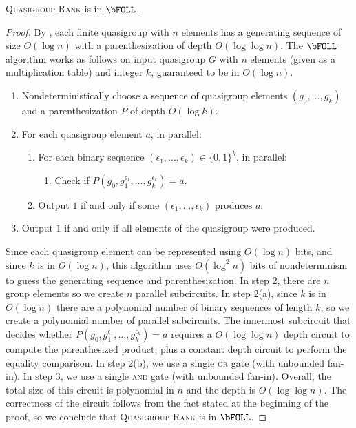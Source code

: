 \documentclass{article}
\begin{document}
\begin{theorem}
  \textsc{Quasigroup Rank} is in $\bFOLL$.
\end{theorem}
\begin{proof}
  By \autocite[Theorem~3.3]{ctw13}, each finite quasigroup with $n$ elements has a generating sequence of size $O(\log n)$ with a parenthesization of depth $O(\log \log n)$.
  The $\bFOLL$ algorithm works as follows on input quasigroup $G$ with $n$ elements (given as a multiplication table) and integer $k$, guaranteed to be in $O(\log n)$.
  \begin{enumerate}
  \item Nondeterministically choose a sequence of quasigroup elements $(g_0, \dotsc, g_k)$ and a parenthesization $P$ of depth $O(\log k)$.
  \item For each quasigroup element $a$, in parallel:
    \begin{enumerate}
    \item For each binary sequence $(\epsilon_1, \dotsc, \epsilon_k) \in \{0, 1\}^k$, in parallel:
      \begin{enumerate}
      \item Check if $P\left(g_0, g_1^{\epsilon_1}, \dotsc, g_k^{\epsilon_k}\right) = a$.
      \end{enumerate}
    \item Output $1$ if and only if some $(\epsilon_1, \dotsc, \epsilon_k)$ produces $a$.
    \end{enumerate}
  \item Output $1$ if and only if all elements of the quasigroup were produced.
  \end{enumerate}
  Since each quasigroup element can be represented using $O(\log n)$ bits, and since $k$ is in $O(\log n)$, this algorithm uses $O(\log^2 n)$ bits of nondeterminism to guess the generating sequence and parenthesization.
  In step 2, there are $n$ group elements so we create $n$ parallel subcircuits.
  In step 2(a), since $k$ is in $O(\log n)$ there are a polynomial number of binary sequences of length $k$, so we create a polynomial number of parallel subcircuits.
  The innermost subcircuit that decides whether $P(g_0, g_1^{\epsilon_1}, \dotsc, g_k^{\epsilon_k}) = a$ requires a $O(\log \log n)$ depth circuit to compute the parenthesized product, plus a constant depth circuit to perform the equality comparison.
  In step 2(b), we use a single \textsc{or} gate (with unbounded fan-in).
  In step 3, we use a single \textsc{and} gate (with unbounded fan-in).
  Overall, the total size of this circuit is polynomial in $n$ and the depth is $O(\log \log n)$.
  The correctness of the circuit follows from the fact stated at the beginning of the proof, so we conclude that \textsc{Quasigroup Rank} is in $\bFOLL$.
\end{proof}
\end{document}
